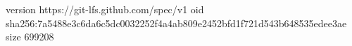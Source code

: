 version https://git-lfs.github.com/spec/v1
oid sha256:7a5488e3c6da6c5dc0032252f4a4ab809e2452bfd1f721d543b648535edee3ae
size 699208
